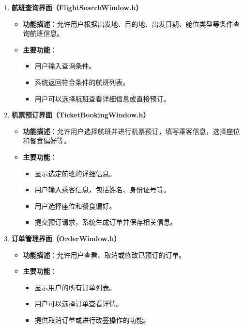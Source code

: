 \documentclass[UTF8, a4paper,12pt]{ctexart}
\begin{document}
\begin{enumerate}
    \item \textbf{航班查询界面（FlightSearchWindow.h）}
    \begin{itemize}
        \item \textbf{功能描述}：允许用户根据出发地、目的地、出发日期、舱位类型等条件查询航班信息。
        \item \textbf{主要功能}：
        \begin{itemize}
            \item 用户输入查询条件。
            \item 系统返回符合条件的航班列表。
            \item 用户可以选择航班查看详细信息或直接预订。
        \end{itemize}
    \end{itemize}
    
    \item \textbf{机票预订界面（TicketBookingWindow.h）}
    \begin{itemize}
        \item \textbf{功能描述}：允许用户选择航班并进行机票预订，填写乘客信息，选择座位和餐食偏好等。
        \item \textbf{主要功能}：
        \begin{itemize}
            \item 显示选定航班的详细信息。
            \item 用户输入乘客信息，包括姓名、身份证号等。
            \item 用户选择座位和餐食偏好。
            \item 提交预订请求，系统生成订单并保存相关信息。
        \end{itemize}
    \end{itemize}
    
    \item \textbf{订单管理界面（OrderWindow.h）}
    \begin{itemize}
        \item \textbf{功能描述}：允许用户查看、取消或修改已预订的订单。
        \item \textbf{主要功能}：
        \begin{itemize}
            \item 显示用户的所有订单列表。
            \item 用户可以选择订单查看详情。
            \item 提供取消订单或进行改签操作的功能。
        \end{itemize}
    \end{itemize}
    

\end{enumerate}
\end{document}
